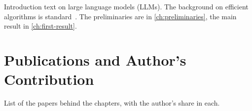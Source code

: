 
Introduction text on large language models (LLMs)\label{abbr:llm}.
The background on efficient algorithms is standard~\cite{Cormen2022}.
The preliminaries are in \cref{ch:preliminaries}, the main result in \cref{ch:first-result}.

\section*{Publications and Author's Contribution}
List of the papers behind the chapters, with the author's share in each.

